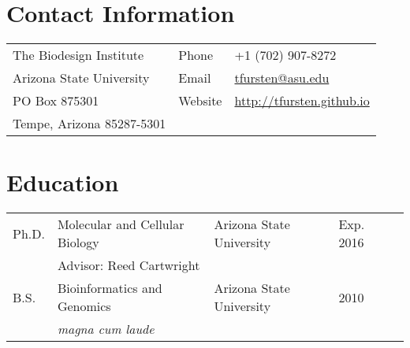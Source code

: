 \documentclass[11pt]{article}
\begin{document}
\section*{Contact Information}
\begin{tabular}[c]{p{3.5in}ll}
The Biodesign Institute& Phone & +1 (702) 907-8272\\
Arizona State University& Email & \href{mailto:tfursten@asu.edu}{tfursten@asu.edu}\\
PO Box 875301 & Website & \href{http://tfursten.github.io}{http://tfursten.github.io}\\
Tempe, Arizona 85287-5301&&\\
\end{tabular}
\section*{Education}
\begin{tabular}[c]{lllll}
Ph.D.& Molecular and Cellular Biology& Arizona State University&Exp. 2016\\
&\multicolumn{3}{l}{Advisor: Reed Cartwright}\\
B.S.&Bioinformatics and Genomics&Arizona State University& 2010\\
&\multicolumn{3}{l}{\textit{magna cum laude}}
\end{tabular}
\end{document}
